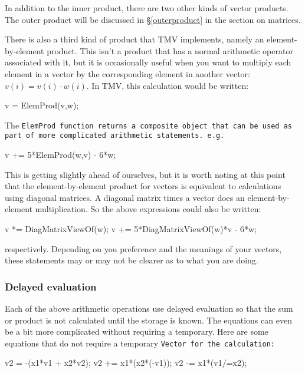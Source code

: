In addition to the inner product, there are two other kinds of vector products.  The outer product will be discussed in \S\ref{outerproduct} in the section on matrices.

There is also a third kind of product that TMV implements, namely an element-by-element product.  This isn't a product that has a normal arithmetic operator associated with it, but it is occasionally useful when you want to multiply each element in a vector by the corresponding element in another vector: $v(i) = v(i) \cdot w(i)$.  In TMV, this calculation would be written:
\begin{tmvcode}
v = ElemProd(v,w);
\end{tmvcode}

The \tt{ElemProd} function returns a composite object that can be used as part of more complicated arithmetic statements.  e.g.
\begin{tmvcode}
v += 5*ElemProd(w,v) - 6*w;
\end{tmvcode}

This is getting slightly ahead of ourselves, but it is worth noting at this point that the element-by-element product for vectors is equivalent to calculations using diagonal matrices.  A diagonal matrix times a vector does an element-by-element multiplication.  So the above expressions could also be written:
\begin{tmvcode}
v *= DiagMatrixViewOf(w);
v += 5*DiagMatrixViewOf(w)*v - 6*w;
\end{tmvcode}
respectively.  Depending on you preference and the meanings of your vectors,
these statements may or may not be clearer as to what you are doing.

\subsubsection{Delayed evaluation}

Each of the above arithmetic operations use delayed evaluation so that the sum or product is not calculated
until the storage is known.  The equations can even be a bit more complicated without 
requiring a temporary.  Here are some equations that do not require a temporary 
\tt{Vector} for the calculation:

\begin{tmvcode}
v2 = -(x1*v1 + x2*v2);
v2 += x1*(x2*(-v1));
v2 -= x1*(v1/=x2);
\end{tmvcode}

